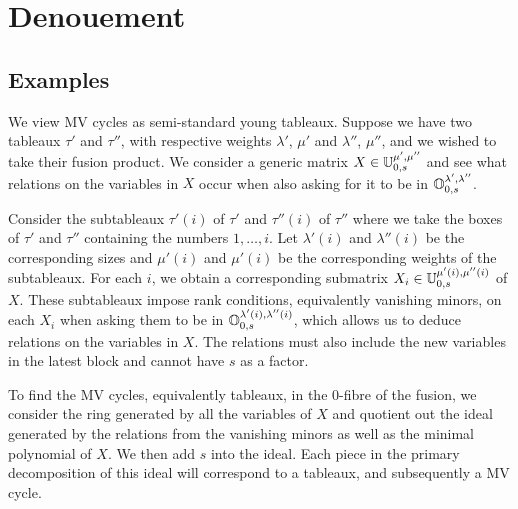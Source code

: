 \documentclass[draft]{article}
\begin{document}
\section{Denouement}
\label{s:denouement}
\subsection{Examples}


We view MV cycles as semi-standard young tableaux. Suppose we have two tableaux $\tau'$ and $\tau''$, with respective weights $\lambda'$, $\mu'$ and $\lambda''$, $\mu''$, and we wished to take their fusion product. We consider a generic matrix $X \in \mathbb U^{\mu',\mu''}_{0,s}$ and see what relations on the variables in $X$ occur when also asking for it to be in $\mathbb O^{\lambda',\lambda''}_{0,s}$. 

Consider the subtableaux $\tau'(i)$ of $\tau'$ and $\tau''(i)$ of $\tau''$ where we take the boxes of $\tau'$ and $\tau''$ containing the numbers $1,\dots,i$. Let $\lambda'(i)$ and $\lambda''(i)$ be the corresponding sizes and $\mu'(i)$ and $\mu'(i)$ be the corresponding weights of the subtableaux. For each $i$, we obtain a corresponding submatrix $X_i \in \mathbb U^{\mu'(i), \mu''(i)}_{0,s}$ of $X$. These subtableaux impose rank conditions, equivalently vanishing minors, on each $X_i$ when asking them to be in $\mathbb O^{\lambda'(i), \lambda''(i)}_{0,s}$, which allows us to deduce relations on the variables in $X$. The relations must also include the new variables in the latest block and cannot have $s$ as a factor.

To find the MV cycles, equivalently tableaux, in the $0$-fibre of the fusion, we consider the ring generated by all the variables of $X$ and quotient out the ideal generated by the relations from the vanishing minors as well as the minimal polynomial of $X$. We then add $s$ into the ideal. Each piece in the primary decomposition of this ideal will correspond to a tableaux, and subsequently a MV cycle.


\end{document}
